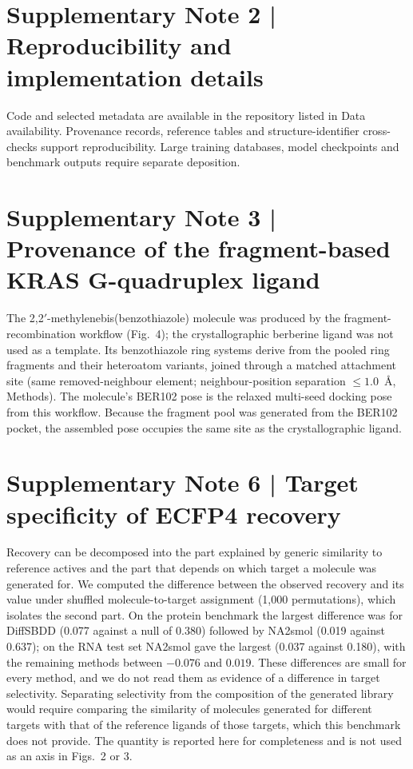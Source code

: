 \section*{Supplementary Note 2 | Reproducibility and implementation details}

Code and selected metadata are available in the repository listed in Data availability. Provenance records, reference tables and structure-identifier cross-checks support reproducibility. Large training databases, model checkpoints and benchmark outputs require separate deposition.

\section*{Supplementary Note 3 | Provenance of the fragment-based KRAS G-quadruplex ligand}

The 2,2$'$-methylenebis(benzothiazole) molecule was produced by the fragment-recombination workflow (Fig.~4); the crystallographic berberine ligand was not used as a template. Its benzothiazole ring systems derive from the pooled ring fragments and their heteroatom variants, joined through a matched attachment site (same removed-neighbour element; neighbour-position separation $\leq1.0$~\AA, Methods). The molecule's BER102 pose is the relaxed multi-seed docking pose from this workflow. Because the fragment pool was generated from the BER102 pocket, the assembled pose occupies the same site as the crystallographic ligand.



\clearpage


\section*{Supplementary Note 6 | Target specificity of ECFP4 recovery}
Recovery can be decomposed into the part explained by generic similarity to reference actives and
the part that depends on which target a molecule was generated for. We computed the difference
between the observed recovery and its value under shuffled molecule-to-target assignment (1,000
permutations), which isolates the second part. On the protein benchmark the largest difference
was for DiffSBDD (0.077 against a null of 0.380) followed by NA2smol (0.019 against 0.637); on the
RNA test set NA2smol gave the largest (0.037 against 0.180), with the remaining methods between
$-0.076$ and $0.019$. These differences are small for every method, and we do not read them as
evidence of a difference in target selectivity. Separating selectivity from the composition of the
generated library would require comparing the similarity of molecules generated for different
targets with that of the reference ligands of those targets, which this benchmark does not provide.
The quantity is reported here for completeness and is not used as an axis in Figs.~2
or 3.
